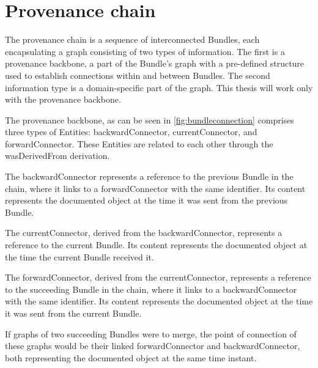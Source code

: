 \documentclass[
  digital,     %
  oneside,     %
  nosansbold,  %
  nocolorbold, %
  lof,         %
  lot,         %
]{fithesis4}
\begin{document}
\section{Provenance chain} \label{s-provchain}
\shorthandoff{-}
The provenance chain is a sequence of interconnected Bundles, each encapsulating a graph consisting of two types of information. The first is a provenance backbone, a part of the Bundle's graph with a pre-defined structure used to establish connections within and between Bundles. The second information type is a domain-specific part of the graph. This thesis will work only with the provenance backbone. 

The provenance backbone, as can be seen in \ref{fig:bundleconnection} comprises three types of Entities: backwardConnector, currentConnector, and forwardConnector. These Entities are related to each other through the wasDerivedFrom derivation. 

The backwardConnector represents a reference to the previous Bundle in the chain, where it links to a forwardConnector with the same identifier. Its content represents the documented object at the time it was sent from the previous Bundle.

The currentConnector, derived from the backwardConnector, represents a reference to the current Bundle. Its content represents the documented object at the time the current Bundle received it.

The forwardConnector, derived from the currentConnector, represents a reference to the succeeding Bundle in the chain, where it links to a backwardConnector with the same identifier. Its content represents the documented object at the time it was sent from the current Bundle.

If graphs of two succeeding Bundles were to merge, the point of connection of these graphs would be their linked forwardConnector and backwardConnector, both representing the documented object at the same time instant. \cite{provchain}
\end{document}
